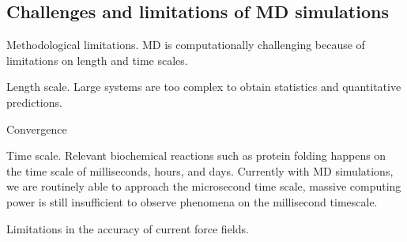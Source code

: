 \subsection{Challenges and limitations of MD simulations}
\begin{outline}
	\1 Methodological limitations. MD is computationally challenging because of limitations on length and time scales. 
	
		\2 Length scale. Large systems are too complex to obtain statistics and quantitative predictions.
		
			\3 Convergence
			
		\2 Time scale. Relevant biochemical reactions such as protein folding happens on the time scale of milliseconds, hours, and days. Currently with MD simulations, we are routinely able to approach the microsecond time scale, massive computing power is still insufficient to observe phenomena on the millisecond timescale. %
		
	\1 Limitations in the accuracy of current force fields.
\end{outline}		

